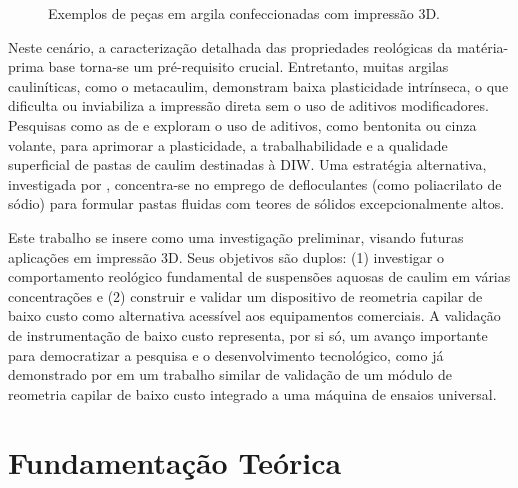 \documentclass[article,12pt,oneside,a4paper,english,brazil,sumario=tradicional]{abntex2}
\begin{document}
\begin{figure}[htbp]
  \centering
  \caption{Exemplos de peças em argila confeccionadas com impressão 3D.}
  \label{fig:exemplos_impressao}
\end{figure}

Neste cenário, a caracterização detalhada das propriedades reológicas da matéria-prima base torna-se um pré-requisito crucial. Entretanto, muitas argilas cauliníticas, como o metacaulim, demonstram baixa plasticidade intrínseca, o que dificulta ou inviabiliza a impressão direta sem o uso de aditivos modificadores. Pesquisas como as de  e  exploram o uso de aditivos, como bentonita ou cinza volante, para aprimorar a plasticidade, a trabalhabilidade e a qualidade superficial de pastas de caulim destinadas à DIW. Uma estratégia alternativa, investigada por , concentra-se no emprego de defloculantes (como poliacrilato de sódio) para formular pastas fluidas com teores de sólidos excepcionalmente altos.

Este trabalho se insere como uma investigação preliminar, visando futuras aplicações em impressão 3D. Seus objetivos são duplos: (1) investigar o comportamento reológico fundamental de suspensões aquosas de caulim em várias concentrações e (2) construir e validar um dispositivo de reometria capilar de baixo custo como alternativa acessível aos equipamentos comerciais. A validação de instrumentação de baixo custo representa, por si só, um avanço importante para democratizar a pesquisa e o desenvolvimento tecnológico, como já demonstrado por  em um trabalho similar de validação de um módulo de reometria capilar de baixo custo integrado a uma máquina de ensaios universal.

\section{Fundamentação Teórica}
\label{sec:teoria}
\end{document}
